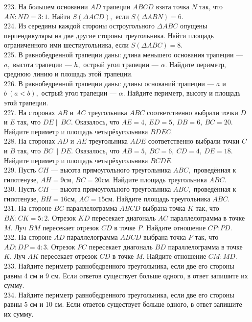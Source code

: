 \documentclass[12pt]{article}
\begin{document}
223. На большем основании $AD$ трапеции $ABCD$ взята точка $N$ так, что $AN:ND=3:1.$ Найти $S(\Delta ACD),$ если $S(\Delta ABN)=6.$\\
224. Из середины каждой стороны остроугольного $\Delta ABC$ опущены перпендикуляры на две другие стороны треугольника. Найти площадь ограниченного ими шестиугольника, если $S(\Delta ABC)=8.$\\
225. В равнобедренной трапеции даны: длина меньшего основания трапеции --- $a,$ высота трапеции --- $h,$ острый угол трапеции --- $\alpha.$ Найдите периметр, среднюю линию и площадь этой трапеции.\\
226. В равнобедренной трапеции даны: длины оснований трапеции --- $a$ и $b\ (a<b),$ острый угол трапеции --- $\alpha.$ Найдите периметр, высоту и площадь этой трапеции.\\
227. На сторонах $AB$ и $AC$ треугольника $ABC$ соответственно выбрали точки $D$ и $E$ так, что $DE\parallel BC.$ Оказалось, что $AE=4,\ ED=5,\ DB=6,\ BC=20.$ Найдите периметр и площадь четырёхугольника $BDEC.$\\
228. На сторонах $AD$ и $AE$ треугольника $ADE$ соответственно выбрали точки $C$ и $B$ так, что $BC\parallel DE.$ Оказалось, что $AB=5,\ BC=6,\ CD=4,\ DE=18.$ Найдите периметр и площадь четырёхугольника $BCDE.$\\
229. Пусть $CH$ --- высота прямоугольного треугольника $ABC,$ проведённая к гипотенузе, $AH=9$см, $BC=20$см. Найдите площадь треугольника $ABC.$\\
230. Пусть $CH$ --- высота прямоугольного треугольника $ABC,$ проведённая к гипотенузе, $BH=16$см, $AC=15$см. Найдите площадь треугольника $ABC.$\\
231. На стороне $BC$ параллелограмма $ABCD$ выбрана точка $K$ так, что $BK:CK=5:2.$ Отрезок $KD$ пересекает диагональ $AC$ параллелограмма в точке $M.$ Луч $BM$ пересекает отрезок $CD$ в точке $P.$ Найдите отношение $CP:PD.$\\
232. На стороне $AD$ параллелограмма $ABCD$ выбрана точка $P$ так, что $AD:DP=4:3.$ Отрезок $PC$ пересекает диагональ $BD$ параллелограмма в точке $K.$ Луч $AK$ пересекает отрезок $CD$ в точке $M.$ Найдите отношение $CM:MD.$\\
233. Найдите периметр равнобедренного треугольника, если две его стороны равны 4 см и 9 см. Если ответов существует больше одного, в ответ запишите их сумму.\\
234. Найдите периметр равнобедренного треугольника, если две его стороны равны 5 см и 10 см. Если ответов существует больше одного, в ответ запишите их сумму.\\
\end{document}
